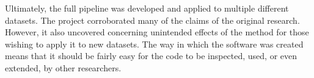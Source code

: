 \documentclass[12pt]{article}
\begin{document}
Ultimately, the full pipeline was developed and applied to multiple different datasets.
The project corroborated many of the claims of the original research.
However, it also uncovered concerning unintended effects of the method for those wishing to apply it to new datasets.
The way in which the software was created means that it should be fairly easy for the code to be inspected,
used, or even extended, by other researchers.



\end{document}

